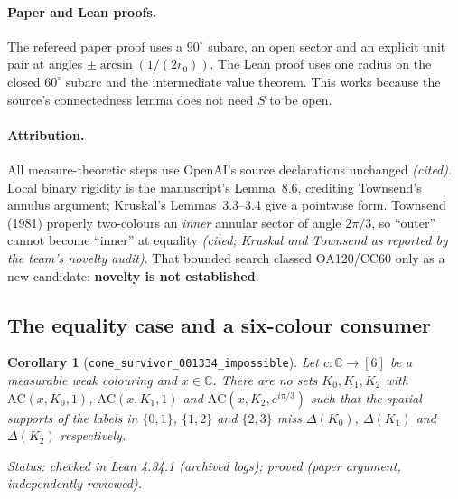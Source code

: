 \documentclass[11pt]{article}
\newtheorem{corollary}[theorem]{Corollary}
\theoremstyle{definition}
\theoremstyle{remark}
\begin{document}
\paragraph{Paper and Lean proofs.} The refereed paper proof uses a
$90^\circ$ subarc, an open sector and an explicit unit pair at angles
$\pm\arcsin(1/(2r_0))$. The Lean proof uses one radius on the closed
$60^\circ$ subarc and the intermediate value theorem. This works because the
source's connectedness lemma does not need $S$ to be open.

\paragraph{Attribution.} All measure-theoretic steps use OpenAI's source
declarations unchanged \emph{(cited)}. Local binary rigidity is the
manuscript's Lemma~8.6, crediting Townsend's annulus argument; Kruskal's
Lemmas~3.3--3.4 give a pointwise form. Townsend (1981) properly two-colours
an \emph{inner} annular sector of angle $2\pi/3$, so ``outer'' cannot
become ``inner'' at equality \emph{(cited; Kruskal and Townsend as reported
by the team's novelty audit)}. That bounded search classed OA120/CC60 only
as a new candidate: \textbf{novelty is not established}.

\subsection{The equality case and a six-colour consumer}

\begin{corollary}[\texttt{cone\_\allowbreak{}survivor\_\allowbreak{}001334\_\allowbreak{}impossible}]\label{cor:survivor}
Let $c:\mathbb C\to[6]$ be a measurable weak colouring and $x\in\mathbb C$.
There are no sets $K_0,K_1,K_2$ with $\mathrm{AC}(x,K_0,1)$,
$\mathrm{AC}(x,K_1,1)$ and $\mathrm{AC}(x,K_2,e^{i\pi/3})$ such that the
spatial supports of the labels in $\{0,1\}$, $\{1,2\}$ and $\{2,3\}$ miss
$\Delta(K_0)$, $\Delta(K_1)$ and $\Delta(K_2)$ respectively.
\end{corollary}
\noindent\emph{Status: checked in Lean 4.34.1 (archived logs); proved
(paper argument, independently reviewed).}
\end{document}
